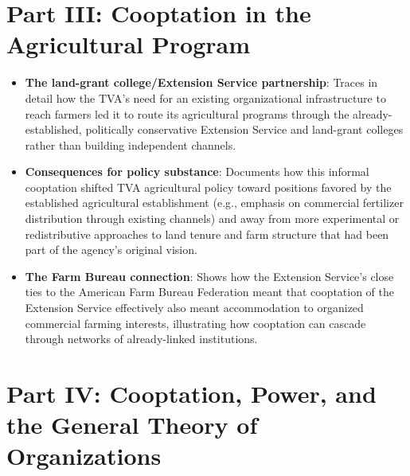 \documentclass[12pt]{article}
\begin{document}
\section{Part III: Cooptation in the Agricultural Program}

\begin{itemize}[leftmargin=*, itemsep=4pt]
    \item \textbf{The land-grant college/Extension Service partnership}: Traces in detail how the TVA's need for an existing organizational infrastructure to reach farmers led it to route its agricultural programs through the already-established, politically conservative Extension Service and land-grant colleges rather than building independent channels.
    \item \textbf{Consequences for policy substance}: Documents how this informal cooptation shifted TVA agricultural policy toward positions favored by the established agricultural establishment (e.g., emphasis on commercial fertilizer distribution through existing channels) and away from more experimental or redistributive approaches to land tenure and farm structure that had been part of the agency's original vision.
    \item \textbf{The Farm Bureau connection}: Shows how the Extension Service's close ties to the American Farm Bureau Federation meant that cooptation of the Extension Service effectively also meant accommodation to organized commercial farming interests, illustrating how cooptation can cascade through networks of already-linked institutions.
\end{itemize}

\section{Part IV: Cooptation, Power, and the General Theory of Organizations}
\end{document}
